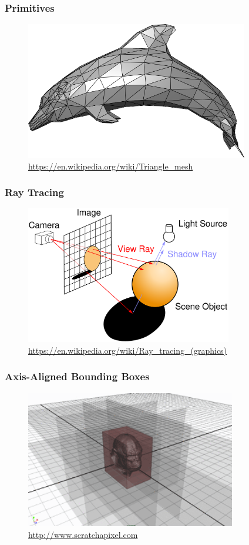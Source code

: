 \documentclass{beamer}
\begin{document}
\begin{frame}
  \frametitle{Primitives}
\begin{figure}
\includegraphics[height=60mm]{Dolphin_triangle_mesh.png}
\hspace{6pt}\hbox{\tiny{\url{https://en.wikipedia.org/wiki/Triangle_mesh}}}
\end{figure}
\end{frame}

\begin{frame}
  \frametitle{Ray Tracing}
\begin{figure}
\includegraphics[height=60mm]{Ray_trace_diagram.pdf}
\hspace{6pt}\hbox{\tiny{\url{https://en.wikipedia.org/wiki/Ray_tracing_(graphics)}}}
\end{figure}
\end{frame}

\begin{frame}
  \frametitle{Axis-Aligned Bounding Boxes}
\begin{figure}
\includegraphics[height=60mm]{aabb.png}
\hspace{6pt}\hbox{\tiny{\url{http://www.scratchapixel.com}}}
\end{figure}
\end{frame}
\end{document}
